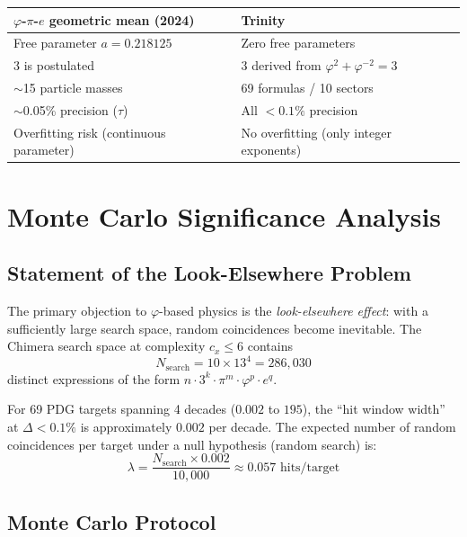 \documentclass[10pt,a4paper]{article}
\begin{document}
\medskip
\noindent\begin{tabular}{@{}p{}p{}@{}}
\toprule
\textbf{$\varphi$-$\pi$-$e$ geometric mean (2024)} & \textbf{Trinity} \\
\midrule
Free parameter $a = 0.218125$ & Zero free parameters \\
3 is postulated & 3 derived from $\varphi^2 + \varphi^{-2} = 3$ \\
$\sim$15 particle masses & 69 formulas / 10 sectors \\
$\sim$0.05\% precision ($\tau$) & All $<0.1\%$ precision \\
Overfitting risk (continuous parameter) & No overfitting (only integer exponents) \\
\bottomrule
\end{tabular}

\medskip

\section*{Monte Carlo Significance Analysis}

\subsection*{Statement of the Look-Elsewhere Problem}

The primary objection to $\varphi$-based physics is the \textit{look-elsewhere effect}:
with a sufficiently large search space, random coincidences become inevitable. The Chimera
search space at complexity $c_x \le 6$ contains
\begin{equation}
  N_{\text{search}} = 10 \times 13^4 = 286{,}030
  \label{eq:searchspace}
\end{equation}
distinct expressions of the form $n \cdot 3^k \cdot \pi^m \cdot \varphi^p \cdot e^q$.

For 69 PDG targets spanning 4 decades ($0.002$ to $195$), the ``hit window width''
at $\Delta < 0.1\%$ is approximately $0.002$ per decade. The expected number of random
coincidences per target under a null hypothesis (random search) is:
\begin{equation}
  \lambda = \frac{N_{\text{search}} \times 0.002}{10{,}000} \approx 0.057 \text{ hits/target}
  \label{eq:lambda}
\end{equation}

\subsection*{Monte Carlo Protocol}
\end{document}
